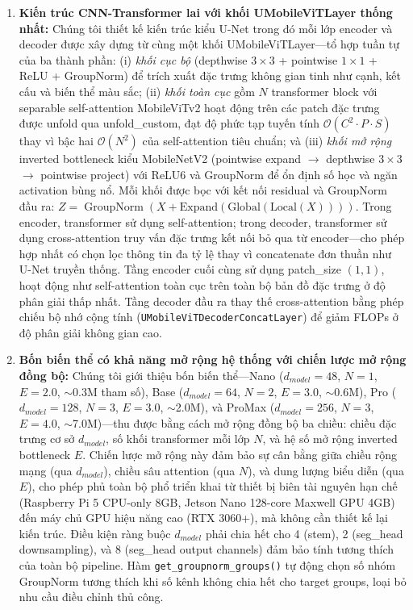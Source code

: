 \documentclass[conference]{IEEEtran}
\DeclareMathOperator{\GroupNorm}{GroupNorm}
\begin{document}
\begin{enumerate}
    \item \textbf{Kiến trúc CNN-Transformer lai với khối UMobileViTLayer thống nhất:} Chúng tôi thiết kế kiến trúc kiểu U-Net trong đó mỗi lớp encoder và decoder được xây dựng từ cùng một khối UMobileViTLayer---tổ hợp tuần tự của ba thành phần: (i) \textit{khối cục bộ} (depthwise $3\times3$ + pointwise $1\times1$ + ReLU + GroupNorm) để trích xuất đặc trưng không gian tinh như cạnh, kết cấu và biến thể màu sắc; (ii) \textit{khối toàn cục} gồm $N$ transformer block với separable self-attention MobileViTv2 hoạt động trên các patch đặc trưng được unfold qua unfold\_custom, đạt độ phức tạp tuyến tính $\mathcal{O}(C^2 \cdot P \cdot S)$ thay vì bậc hai $\mathcal{O}(N^2)$ của self-attention tiêu chuẩn; và (iii) \textit{khối mở rộng} inverted bottleneck kiểu MobileNetV2 (pointwise expand $\rightarrow$ depthwise $3\times3$ $\rightarrow$ pointwise project) với ReLU6 và GroupNorm để ổn định số học và ngăn activation bùng nổ. Mỗi khối được bọc với kết nối residual và GroupNorm đầu ra: $Z = \GroupNorm(X + \text{Expand}(\text{Global}(\text{Local}(X))))$. Trong encoder, transformer sử dụng self-attention; trong decoder, transformer sử dụng cross-attention truy vấn đặc trưng kết nối bỏ qua từ encoder---cho phép hợp nhất có chọn lọc thông tin đa tỷ lệ thay vì concatenate đơn thuần như U-Net truyền thống. Tầng encoder cuối cùng sử dụng patch\_size $(1,1)$, hoạt động như self-attention toàn cục trên toàn bộ bản đồ đặc trưng ở độ phân giải thấp nhất. Tầng decoder đầu ra thay thế cross-attention bằng phép chiếu bộ nhớ cộng tính (\texttt{UMobileViTDecoderConcatLayer}) để giảm FLOPs ở độ phân giải không gian cao.

    \item \textbf{Bốn biến thể có khả năng mở rộng hệ thống với chiến lược mở rộng đồng bộ:} Chúng tôi giới thiệu bốn biến thể---Nano ($d_{model}=48$, $N=1$, $E=2.0$, $\sim$0.3M tham số), Base ($d_{model}=64$, $N=2$, $E=3.0$, $\sim$0.6M), Pro ($d_{model}=128$, $N=3$, $E=3.0$, $\sim$2.0M), và ProMax ($d_{model}=256$, $N=3$, $E=4.0$, $\sim$7.0M)---thu được bằng cách mở rộng đồng bộ ba chiều: chiều đặc trưng cơ sở $d_{model}$, số khối transformer mỗi lớp $N$, và hệ số mở rộng inverted bottleneck $E$. Chiến lược mở rộng này đảm bảo sự cân bằng giữa chiều rộng mạng (qua $d_{model}$), chiều sâu attention (qua $N$), và dung lượng biểu diễn (qua $E$), cho phép phủ toàn bộ phổ triển khai từ thiết bị biên tài nguyên hạn chế (Raspberry Pi 5 CPU-only 8GB, Jetson Nano 128-core Maxwell GPU 4GB) đến máy chủ GPU hiệu năng cao (RTX 3060+), mà không cần thiết kế lại kiến trúc. Điều kiện ràng buộc $d_{model}$ phải chia hết cho 4 (stem), 2 (seg\_head downsampling), và 8 (seg\_head output channels) đảm bảo tính tương thích của toàn bộ pipeline. Hàm \texttt{get\_groupnorm\_groups()} tự động chọn số nhóm GroupNorm tương thích khi số kênh không chia hết cho target groups, loại bỏ nhu cầu điều chỉnh thủ công.


\end{enumerate}
\end{document}
